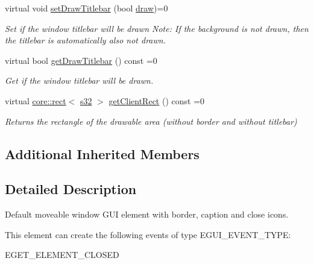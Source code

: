 \begin{DoxyCompactItemize}
\mbox{\label{classirr_1_1gui_1_1IGUIWindow_ae8fa25bf5eec28b8fd663f2e3856200b}} 
virtual void \hyperlink{classirr_1_1gui_1_1IGUIWindow_ae8fa25bf5eec28b8fd663f2e3856200b}{set\+Draw\+Titlebar} (bool \hyperlink{classirr_1_1gui_1_1IGUIElement_a1ef7eeaff67b8a9f4f37cacdc7e54be2}{draw})=0
\begin{DoxyCompactList}\small\item\em Set if the window titlebar will be drawn Note\+: If the background is not drawn, then the titlebar is automatically also not drawn. \end{DoxyCompactList}\item 
\mbox{\label{classirr_1_1gui_1_1IGUIWindow_a634a224a31577fb7eeef578c9a351b69}} 
virtual bool \hyperlink{classirr_1_1gui_1_1IGUIWindow_a634a224a31577fb7eeef578c9a351b69}{get\+Draw\+Titlebar} () const =0
\begin{DoxyCompactList}\small\item\em Get if the window titlebar will be drawn. \end{DoxyCompactList}\item 
virtual \hyperlink{classirr_1_1core_1_1rect}{core\+::rect}$<$ \hyperlink{namespaceirr_ac66849b7a6ed16e30ebede579f9b47c6}{s32} $>$ \hyperlink{classirr_1_1gui_1_1IGUIWindow_aa6d240eb9d5b9b44c0e45fcef47e6216}{get\+Client\+Rect} () const =0
\begin{DoxyCompactList}\small\item\em Returns the rectangle of the drawable area (without border and without titlebar) \end{DoxyCompactList}\end{DoxyCompactItemize}
\subsection*{Additional Inherited Members}


\subsection{Detailed Description}
Default moveable window G\+UI element with border, caption and close icons. 

\begin{DoxyParagraph}{This element can create the following events of type E\+G\+U\+I\+\_\+\+E\+V\+E\+N\+T\+\_\+\+T\+Y\+PE\+:}
\begin{DoxyItemize}
\item E\+G\+E\+T\+\_\+\+E\+L\+E\+M\+E\+N\+T\+\_\+\+C\+L\+O\+S\+ED \end{DoxyItemize}

\end{DoxyParagraph}



